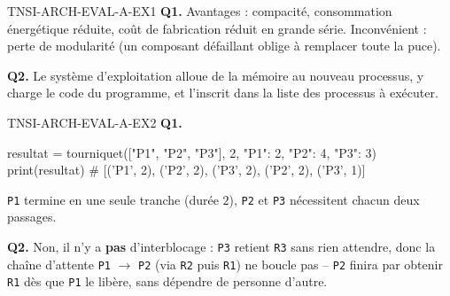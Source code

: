 \begin{corrige}{TNSI-ARCH-EVAL-A-EX1}
\textbf{Q1.} Avantages : compacité, consommation énergétique réduite, coût de fabrication réduit en grande série. Inconvénient : perte de modularité (un composant défaillant oblige à remplacer toute la puce).

\textbf{Q2.} Le système d'exploitation alloue de la mémoire au nouveau processus, y charge le code du programme, et l'inscrit dans la liste des processus à exécuter.
\end{corrige}

\begin{corrige}{TNSI-ARCH-EVAL-A-EX2}
\textbf{Q1.}
\begin{python}
resultat = tourniquet(["P1", "P2", "P3"], 2, {"P1": 2, "P2": 4, "P3": 3})
print(resultat)  # [('P1', 2), ('P2', 2), ('P3', 2), ('P2', 2), ('P3', 1)]
\end{python}
\texttt{P1} termine en une seule tranche (durée $2$), \texttt{P2} et \texttt{P3} nécessitent chacun deux passages.

\textbf{Q2.} Non, il n'y a \textbf{pas} d'interblocage : \texttt{P3} retient \texttt{R3} sans rien attendre, donc la chaîne d'attente \texttt{P1} $\to$ \texttt{P2} (via \texttt{R2} puis \texttt{R1}) ne boucle pas -- \texttt{P2} finira par obtenir \texttt{R1} dès que \texttt{P1} le libère, sans dépendre de personne d'autre.
\end{corrige}
